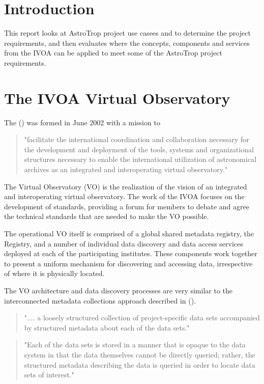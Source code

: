 \documentclass{article}
\begin{document}
\section{Introduction}

This report looks at AstroTrop project use casees and to determine the project
requirements, and then evaluates where the concepts, components and services
from the IVOA can be applied to meet some of the AstroTrop project requirements.

\section{The IVOA Virtual Observatory}

The  (\cite{ivoa}) was formed in June 2002 with a mission to
\begin{quote}
"facilitate the international coordination and collaboration
necessary for the development and deployment of the tools, systems and
organizational structures necessary to enable the international utilization of
astronomical archives as an integrated and interoperating virtual observatory."
\end{quote}

The Virtual Observatory (VO) is the realization of the \cite{ivoa} vision of
an integrated and interoperating virtual observatory.
The work of the IVOA focuses on the development of standards, providing a forum
for members to debate and agree the technical standards that are needed to make
the VO possible.

The operational VO itself is comprised of a global shared metadata registry,
the Registry, and a number of individual data discovery and data access services
deployed at each of the participating institutes.
These components work together to present a uniform mechanism for discovering
and accessing data, irrespective of where it is physically located.

The VO architecture and data discovery processes are very similar to the
interconnected metadata collections approach described in
 (\cite{jones-2006}).

\begin{quote}
".... a loosely structured collection of project-specific data sets
accompanied by structured metadata about each of the data sets."
\end{quote}

\begin{quote}
"Each of the data sets is stored in a manner that is opaque to the data system in
that the data themselves cannot be directly queried; rather, the structured
metadata describing the data is queried in order to locate data sets of
interest."
\end{quote}
\end{document}
